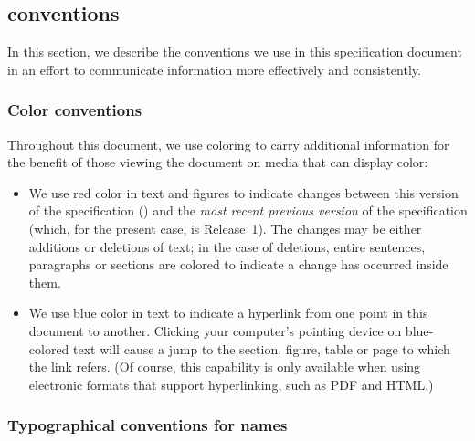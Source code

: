 \begin{blockChanged}
\subsection{ conventions}
\label{sec:notation}

In this section, we describe the conventions we use in this
specification document in an effort to communicate information
more effectively and consistently.


\subsubsection{Color conventions}
\label{sec:notation-color}

Throughout this document, we use coloring to carry additional
information for the benefit of those viewing the document on media
that can display color:

\begin{itemize}

\item We use red color in text and figures to indicate changes
  between this version of the specification (\thisLVR) and the
  \emph{most recent previous version} of the specification (which,
  for the present case, is \sbmltwotwo Release~1).  The changes
  may be either additions or deletions of text; in the case of
  deletions, entire sentences, paragraphs or sections are colored
  to indicate a change has occurred inside them.

\item We use blue color in text to indicate a hyperlink from one
  point in this document to another.  Clicking your computer's
  pointing device on blue-colored text will cause a jump to the
  section, figure, table or page to which the link refers.  (Of
  course, this capability is only available when using electronic
  formats that support hyperlinking, such as PDF and
  HTML.)

\end{itemize}

\end{blockChanged}


\subsubsection{Typographical conventions for names}
\label{sec:notation-typographical}

